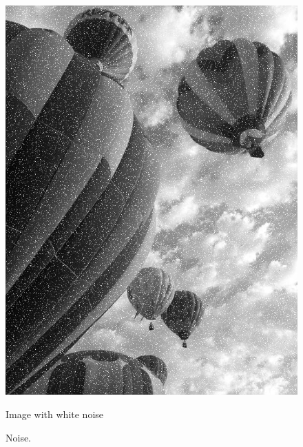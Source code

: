 \begin{figure}
\begin{minipage}[b]{0.47\linewidth}
\includegraphics[width=\textwidth]{lab_noised_baloons_resized_bw.jpg}
\caption*{Image with white noise}
\end{minipage}
\caption{Noise.}
\label{fig:noise_firstattempt}
\end{figure}

